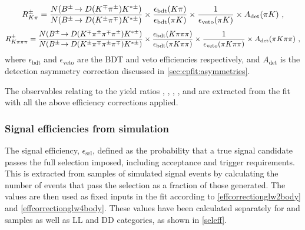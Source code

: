 {\footnotesize
\begin{equation}
R^{\pm}_{K\pi} = \frac{N({{B}^\pm}\!\rightarrow {\ensuremath{D}}({{K}^\mp}{{\pi}^\pm}){{K}^{*\pm}})}{N({{B}^\pm}\!\rightarrow {\ensuremath{D}}({{K}^\pm}{{\pi}^\mp}){{K}^{*\pm}})} \times \frac{\epsilon_{\text{bdt}}(K\pi)}{\epsilon_{\text{bdt}}(\pi K)} \times \frac{1}{\epsilon_{\text{veto}}(\pi K)} \times A_{\text{det}}(\pi K) \text{ ,}
\label{effcorrectionads2body}
\end{equation}
\begin{equation}
R^{\pm}_{K\pi\pi\pi} = \frac{N({{B}^\pm}\!\rightarrow {\ensuremath{D}}({{K}^\mp}{{\pi}^\pm}{{\pi}^\mp}{{\pi}^\pm}){{K}^{*\pm}})}{N({{B}^\pm}\!\rightarrow {\ensuremath{D}}({{K}^\pm}{{\pi}^\mp}{{\pi}^\pm}{{\pi}^\mp}){{K}^{*\pm}})} \times \frac{\epsilon_{\text{bdt}}(K\pi\pi\pi)}{\epsilon_{\text{bdt}}(\pi K\pi\pi)} \times \frac{1}{\epsilon_{\text{veto}}(\pi K\pi\pi)} \times A_{\text{det}}(\pi K\pi\pi) \text{ ,}
\label{effcorrectionads4body}
\end{equation}}
where $\epsilon_{\text{bdt}}$ and $\epsilon_{\text{veto}}$ are the BDT and veto efficiencies respectively, and $A_{\text{det}}$ is the detection asymmetry correction discussed in \sect\ref{sec:cpfit:asymmetries}.

The \CP observables relating to the yield ratios \Rkk, \Rpipi, \Rptwo,  \Rmtwo \Rpipipipi, \Rpfour and  \Rmfour are extracted from the \CP fit with all the above efficiency corrections applied.

\subsubsection{Signal efficiencies from simulation}
\label{sec:cpfit:efficiencies:signal}

The signal efficiency, $\epsilon_{\text{sel}}$, defined as the probability that a true signal candidate passes the full selection imposed, including acceptance and trigger requirements. This is extracted from samples of simulated signal events by calculating the number of events that pass the selection as a fraction of those generated. The values are then used as fixed inputs in the \CP fit according to \eqns\ref{effcorrectionglw2body} and \ref{effcorrectionglw4body}. These values have been calculated separately for \runone and \runtwo samples as well as LL and DD categories, as shown in \tab\ref{seleff}. 

